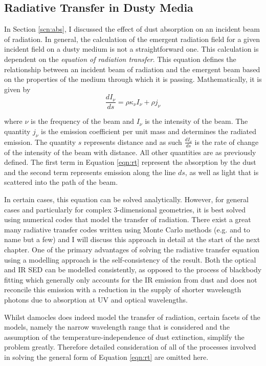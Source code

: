 \subsection{Radiative Transfer in Dusty Media}
\label{scn:rt}
In Section \ref{scn:abs}, I discussed the effect of dust absorption on an incident beam of radiation.  In general, the calculation of the emergent radiation field for a given incident field on a dusty medium is not a straightforward one.  This calculation is dependent on the {\em equation of radiation transfer}.  This equation defines the relationship between an incident beam of radiation and the emergent beam based on the properties of the medium through which it is passing.  Mathematically, it is given by 
\begin{equation}
\label{eqn:rt}
\frac{dI_{\nu}}{ds}=\rho \kappa_{\nu} I_{\nu} + \rho j_{\nu}
\end{equation}
 
\noindent where $\nu$ is the frequency of the beam and $I_{\nu}$ is the intensity of the beam.  The quantity $j_{\nu}$ is the emission coefficient per unit mass and determines the radiated emission.  The quantity $s$ represents distance and as such $\frac{dI_{\nu}}{ds}$ is the rate of change of the intensity of the beam with distance.  All other quantities are as previously defined.  The first term in Equation \ref{eqn:rt} represent the absorption by the dust and the second term represents emission along the line $ds$, as well as light that is scattered into the path of the beam.

In certain cases, this equation can be solved analytically.  However, for general cases and particularly for complex 3-dimensional geometries, it is best solved using numerical codes that model the transfer of radiation.  There exist a great many radiative transfer codes written using Monte Carlo methods (e.g. \citealt{Harries2000,Wood2001,Baes2003,Wood2004,Ercolano2005} and \citealt{Robitaille2011} to name but a few) and I will discuss this approach in detail at the start of the next chapter.  One of the primary advantages of solving the radiative transfer equation using a modelling approach is the self-consistency of the result.  Both the optical and IR SED can be modelled consistently, as opposed to the process of blackbody fitting which generally only accounts for the IR emission from dust and does not reconcile this emission with a reduction in the supply of shorter wavelength photons due to absorption at UV and optical wavelengths.

Whilst {\sc damocles} does indeed model the transfer of radiation, certain facets of the models, namely the narrow wavelength range that is considered and the assumption of the temperature-independence of dust extinction, simplify the problem greatly. Therefore detailed consideration of all of the processes involved in solving the general form of Equation \ref{eqn:rt} are omitted here.

